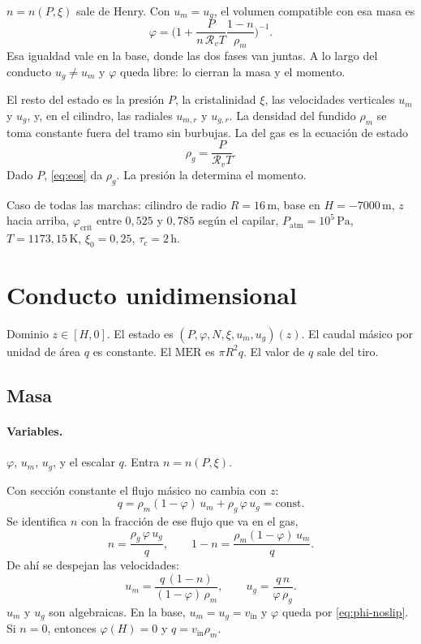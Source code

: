 \documentclass[11pt,a4paper]{article}
\newcommand{\Rv}{\mathcal{R}_v}
\newcommand{\vin}{v_{\mathrm{in}}}
\begin{document}
$n=n(P,\xi)$ sale de Henry. Con $u_m=u_g$, el volumen compatible con
esa masa es
\begin{equation}
\label{eq:phi-noslip}
\varphi
=\Biggl(1+\frac{P}{n\,\Rv T}\frac{1-n}{\rho_m}\Biggr)^{-1}.
\end{equation}
Esa igualdad vale en la base, donde las dos fases van juntas. A lo
largo del conducto $u_g\neq u_m$ y $\varphi$ queda libre: lo cierran
la masa y el momento.

El resto del estado es la presión $P$, la cristalinidad $\xi$, las
velocidades verticales $u_m$ y $u_g$, y, en el cilindro, las radiales
$u_{m,r}$ y $u_{g,r}$. La densidad del fundido $\rho_m$ se toma
constante fuera del tramo sin burbujas. La del gas es la ecuación de
estado
\begin{equation}
\label{eq:eos}
\rho_g=\frac{P}{\Rv T}.
\end{equation}
Dado $P$, \eqref{eq:eos} da $\rho_g$. La presión la determina el
momento.

Caso de todas las marchas: cilindro de radio $R=16\,\mathrm{m}$,
base en $H=-7000\,\mathrm{m}$, $z$ hacia arriba,
$\varphi_{\mathrm{crit}}$ entre $0{,}525$ y $0{,}785$ según el
capilar, $P_{\mathrm{atm}}=10^{5}\,\mathrm{Pa}$,
$T=1173{,}15\,\mathrm{K}$, $\xi_0=0{,}25$,
$\tau_c=2\,\mathrm{h}$.

\section{Conducto unidimensional}
\label{sec:1d}

Dominio $z\in[H,0]$. El estado es
$(P,\varphi,N,\xi,u_m,u_g)(z)$. El caudal másico por unidad de área
$q$ es constante. El $\mathrm{MER}$ es $\pi R^2 q$. El valor de $q$
sale del tiro.

\subsection{Masa}

\paragraph{Variables.}
$\varphi$, $u_m$, $u_g$, y el escalar $q$. Entra $n=n(P,\xi)$.

Con sección constante el flujo másico no cambia con $z$:
\begin{equation}
\label{eq:q}
q
=\rho_m(1-\varphi)\,u_m
+\rho_g\,\varphi\,u_g
=\mathrm{const}.
\end{equation}
Se identifica $n$ con la fracción de ese flujo que va en el gas,
\begin{equation}
\label{eq:n-flux}
n
=\frac{\rho_g\,\varphi\,u_g}{q},
\qquad
1-n
=\frac{\rho_m(1-\varphi)\,u_m}{q}.
\end{equation}
De ahí se despejan las velocidades:
\begin{equation}
\label{eq:vel}
u_m
=\frac{q\,(1-n)}{(1-\varphi)\,\rho_m},
\qquad
u_g
=\frac{q\,n}{\varphi\,\rho_g}.
\end{equation}
$u_m$ y $u_g$ son algebraicas. En la base, $u_m=u_g=\vin$ y
$\varphi$ queda por \eqref{eq:phi-noslip}. Si $n=0$, entonces
$\varphi(H)=0$ y $q=\vin\rho_m$.
\end{document}
